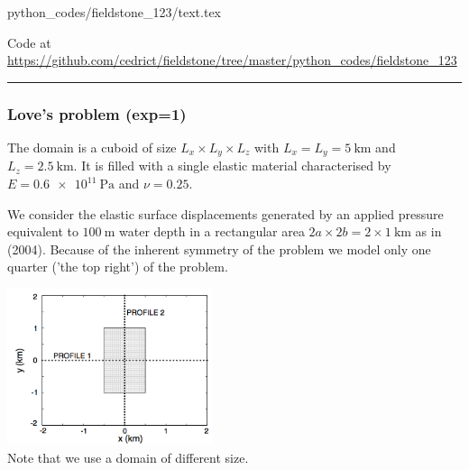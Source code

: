 \begin{flushright} {\tiny {\color{gray} python\_codes/fieldstone\_123/text.tex}} \end{flushright}



\begin{center}

Code at \url{https://github.com/cedrict/fieldstone/tree/master/python_codes/fieldstone_123}
\end{center}

\par\noindent\rule{\textwidth}{0.4pt}


\subsubsection*{Love's problem (exp=1)}

The domain is a cuboid of size $L_x\times L_y \times L_z$ with $L_x=L_y=\SI{5}{\km}$
and $L_z=\SI{2.5}{\km}$. 
It is filled with a single elastic material characterised by $E=\SI{0.6e11}{\pascal}$ and $\nu=0.25$. 

We consider the elastic surface displacements generated by an 
applied pressure equivalent to $\SI{100}{\meter}$ 
water depth in a rectangular area $2a\times 2b = 2\times 1~\si{\km}$
as in \textcite{bebe04} (2004).
Because of the inherent symmetry of the problem we model only one quarter ('the top right')
of the problem.

\begin{center}
\includegraphics[width=6cm]{python_codes/fieldstone_123/images/fig1}\\
{\captionfont Note that we use a domain of different size.}
\end{center}

